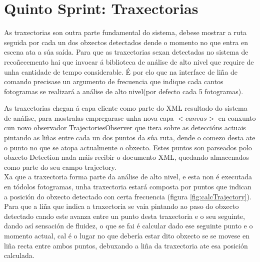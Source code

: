 \section{Quinto Sprint: Traxectorias}
    
    As traxectorias son outra parte fundamental do sistema, debese mostrar a ruta seguida por 
    cada un dos obxectos detectados dende o momento no que entra en escena ata a súa saída. Para 
    que as traxectorias sexan detectadas no sistema de recoñecemento hai que invocar á biblioteca 
    de análise de alto nivel que require de unha cantidade de tempo considerable. É por elo que na 
    interface de liña de comando precisase un argumento de frecuencia que indique cada cantos 
    fotogramas se realizará a análise de alto nivel(por defecto cada 5 fotogramas).
    
    As traxectorias chegan á capa cliente como parte do XML resultado do sistema de análise, para 
    mostralas empregarase unha nova capa $<canvas>$ en conxunto cun novo observador 
    TrajectoriesObserver que itera sobre as deteccións actuais pintando as liñas entre cada un dos
    puntos da súa ruta, dende o comezo desta ate o punto no que se atopa actualmente o obxecto. 
    Estes puntos son parseados polo obxecto Detection nada máis recibir o documento XML, quedando
    almacenados como parte do seu campo trajectory.\\
    
    Xa que a traxectoria forma parte da análise de alto nivel, e esta 
    non é executada en tódolos fotogramas, unha traxectoria estará composta por puntos que indican a
    posición do obxecto detectado con certa frecuencia (figura \ref{fig:calcTrajectory}).
    Para que a liña que indica a traxectoria se vaia pintando ao paso do obxecto detectado cando
    este avanza entre un punto desta traxectoria e o seu seguinte, dando así sensación de fluidez, 
    o que se fai é calcular dado ese seguinte punto e o momento actual, cal é o lugar no que debería
    estar dito obxecto se se movese en liña recta entre ambos puntos, debuxando a liña da 
    traxectoria ate esa posición calculada.
    
